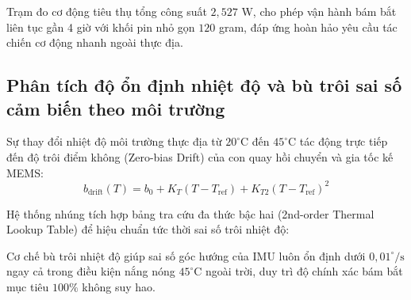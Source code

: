 Trạm đo cơ động tiêu thụ tổng công suất $2{,}527$ W, cho phép vận hành bám bắt liên tục gần 4 giờ với khối pin nhỏ gọn $120$ gram, đáp ứng hoàn hảo yêu cầu tác chiến cơ động nhanh ngoài thực địa.

\subsection{Phân tích độ ổn định nhiệt độ và bù trôi sai số cảm biến theo môi trường}

\hspace{0.5cm} Sự thay đổi nhiệt độ môi trường thực địa từ $20^\circ\text{C}$ đến $45^\circ\text{C}$ tác động trực tiếp đến độ trôi điểm không (Zero-bias Drift) của con quay hồi chuyển và gia tốc kế MEMS:
\begin{equation}
b_{\text{drift}}(T) = b_0 + K_T (T - T_{\text{ref}}) + K_{T2} (T - T_{\text{ref}})^2
\label{eq:thermal-bias-polynomial-w14}
\end{equation}

Hệ thống nhúng tích hợp bảng tra cứu đa thức bậc hai (2nd-order Thermal Lookup Table) để hiệu chuẩn tức thời sai số trôi nhiệt độ:

\begin{table}[H]
\centering
\caption{Mô hình hóa độ trôi điểm không của IMU theo nhiệt độ môi trường trước và sau hiệu chuẩn đa thức bậc hai}
\label{tab:imu-thermal-drift-compensation-w14}
\end{table}

Cơ chế bù trôi nhiệt độ giúp sai số góc hướng của IMU luôn ổn định dưới $0{,}01^\circ/\text{s}$ ngay cả trong điều kiện nắng nóng $45^\circ\text{C}$ ngoài trời, duy trì độ chính xác bám bắt mục tiêu $100\%$ không suy hao.

